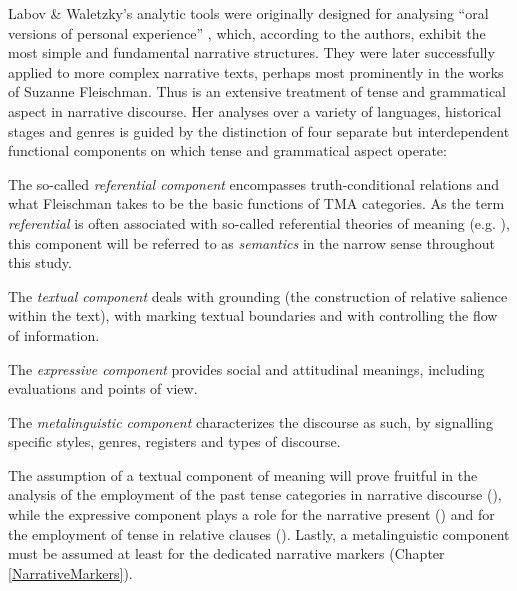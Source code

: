Labov \& Waletzky's analytic tools were originally designed for analysing ``oral versions of personal experience'' \citep[12]{LabovWWaletzkyJ1967}, which, according to the authors, exhibit the most simple and fundamental narrative structures. They were later successfully applied to more complex narrative texts, perhaps most prominently in the works of Suzanne Fleischman. Thus \citet{FleischmanS1990} is an extensive treatment of tense and grammatical aspect in narrative discourse. Her analyses over a variety of languages, historical stages and genres is guided by the distinction of four separate but interdependent functional components on which tense and grammatical aspect operate:
\begin{compactitem}
\item The so-called \textit{referential component} encompasses truth-conditional relations and what Fleischman takes to be the basic functions of TMA categories. As the term \textit{referential} is often associated with so-called referential theories of meaning (e.g. \citealt{OgdenCKRichardsIA1923}), this component will be referred to as \textit{semantics} in the narrow sense throughout this study.
\item The \textit{textual component} deals with grounding (the construction of relative salience within the text), with marking textual boundaries and with controlling the flow of information.
\item The \textit{expressive component} provides social and attitudinal meanings, including evaluations and points of view.
\item The \textit{metalinguistic component} characterizes the discourse as such, by signalling specific styles, genres, registers and types of discourse.
\end{compactitem}

The assumption of a textual component of meaning will prove fruitful in the analysis of the employment of the past tense categories in narrative discourse (), while the expressive component plays a role for the narrative present () and for the employment of tense in relative clauses (). Lastly, a metalinguistic component must be assumed at least for the dedicated narrative markers (Chapter \ref{NarrativeMarkers}).

